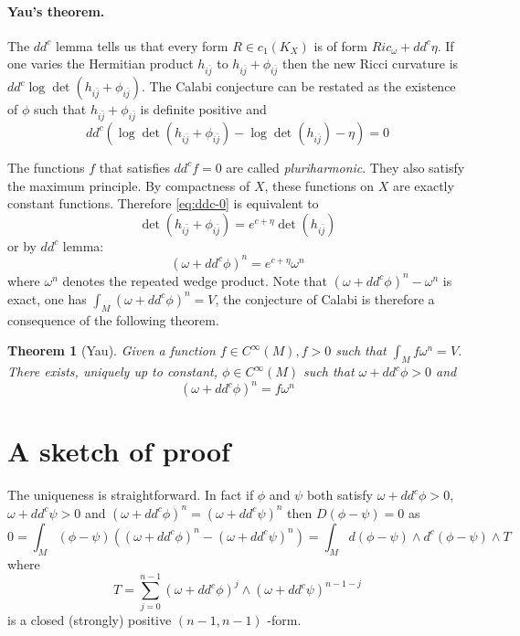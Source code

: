 \documentclass[11pt]{article}
\newtheorem{theorem}{Theorem}
\begin{document}
\paragraph{Yau's theorem.}
\label{sec:org32b43cf}
The \(dd^c\) lemma tells us that every form \(R\in c_1(K_X)\) is of form \(Ric_{\omega} + dd^c\eta\). If one
varies the Hermitian product \(h_{i\bar j}\) to \(h_{i\bar j} + \phi_{i\bar j}\) then the new Ricci
curvature is \(dd^c\log\det(h_{i\bar j} + \phi_{i\bar j})\). The Calabi conjecture can be restated as
the existence of \(\phi\) such that \(h_{i\bar j} + \phi_{i\bar j}\) is definite positive and
\begin{equation}
\label{eq:ddc-0}
dd^c\left( \log\det(h_{i\bar j} + \phi_{i\bar j}) - \log\det(h_{i\bar j}) -\eta\right) = 0
\end{equation}

The functions \(f\) that satisfies \(dd^cf = 0\) are called \emph{pluriharmonic}. They also satisfy the
maximum principle. By compactness of \(X\), these functions on \(X\) are exactly constant
functions. Therefore \eqref{eq:ddc-0} is equivalent to
\[
\det(h_{i\bar j} + \phi_{i\bar j}) = e^{c+\eta}\det(h_{i \bar j})
\]
or by \(dd^c\) lemma:
\[
(\omega + dd^c\phi)^n = e^{c+\eta}\omega^n
\]
where \(\omega^n\) denotes the repeated wedge product. Note that \((\omega +dd^c\phi)^n - \omega^n\) is exact,
one has \(\int_M (\omega +dd^c\phi)^n = V\), the conjecture of Calabi is therefore a consequence of
the following theorem.

\begin{theorem}[Yau]
Given a function \(f\in C^\infty(M), f>0\) such that \(\int_M f\omega^n = V\). There exists, uniquely
up to constant, \(\phi\in C^\infty(M)\) such that \(\omega + dd^c\phi >0\) and
\[
(\omega + dd^c\phi)^n = f\omega^n
\]
\end{theorem}

\section{A sketch of proof}
\label{sec:org351f259}
The uniqueness is straightforward. In fact if \(\phi\) and \(\psi\)
both satisfy \(\omega + dd^c\phi >0\), \(\omega + dd^c \psi >0\) and \((\omega + dd^c\phi)^n = (\omega +
dd^c\psi)^n\) then \(D(\phi - \psi) = 0\) as \[ 0 = \int_M (\phi - \psi)((\omega + dd^c\phi)^n -
(\omega + dd^c\psi)^n) = \int_M d(\phi -\psi)\wedge d^c (\phi -\psi) \wedge T \] where 
\[ 
T =\sum_{j=0}^{n-1}(\omega + dd^c\phi)^j\wedge (\omega + dd^c\psi)^{n-1-j} 
\] 
is a closed (strongly)
positive \((n-1,n-1)\) -form.
\end{document}
